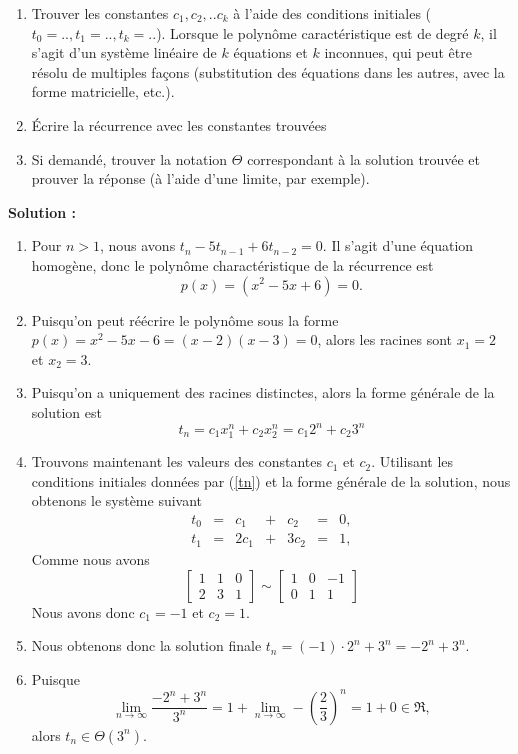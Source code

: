 \documentclass[11pt]{article} %
\newenvironment{solution}[1][\unskip]{%
	\par
	\noindent
	\textbf{Solution #1:}
	\noindent}
{\medskip}
\begin{document}
{\begin{enumerate}
\begin{itemize}
		\end{itemize}
		\item Trouver les constantes $c_1, c_2, ..c_k$ à l'aide des conditions initiales ($t_0 = .., t_1=.., t_k = ..$). Lorsque le polynôme caractéristique est de degré $k$, il s'agit d'un système linéaire de $k$ équations et $k$ inconnues, qui peut être résolu de multiples façons (substitution des équations dans les autres, avec la forme matricielle, etc.).
		\item Écrire la récurrence avec les constantes trouvées
		\item Si demandé, trouver la notation $\Theta$ correspondant à la solution trouvée et prouver la réponse (à l'aide d'une limite, par exemple).
	\end{enumerate}
}
\begin{solution}
	\begin{enumerate}
		\item Pour $n>1$, nous avons $t_n-5t_{n-1}+6t_{n-2}=0$. Il s'agit d'une équation homogène, donc le polynôme charactéristique de la récurrence est $$p(x)=(x^2-5x+6)=0.$$
		\item Puisqu'on peut réécrire le polynôme sous la forme $p(x) = x^2-5x-6 = (x-2)(x-3)=0$, alors les racines sont $x_1 = 2$ et $x_2 = 3$.
		\item Puisqu'on a uniquement des racines distinctes, alors la forme générale de la solution est
		$$t_n = c_1 x_1^n + c_2 x_2^n = c_1 2^n + c_2 3^n$$
		\item Trouvons maintenant les valeurs des constantes $c_1$ et $c_2$.
	Utilisant les conditions initiales données par (\ref{tn}) et la forme générale de la solution, nous obtenons le système suivant
	\begin{equation*}
	\begin{array}{ccccccccc}
	t_0 & = & c_1 & + & c_2 &=& 0,\\
	t_1 & = & 2c_1& + & 3c_2& = & 1,
	\end{array}
	\end{equation*}
	Comme nous avons
	\begin{equation*}
	\left[\begin{array}{cc|c}
	1 & 1 & 0\\
	2 & 3 & 1
	\end{array}\right] \sim \left[\begin{array}{cc|c}
	1 & 0  & -1\\
	0 & 1  & 1
	\end{array}\right]
	\end{equation*}
	Nous avons donc $c_1 = -1$ et $c_2 = 1$.
	\item 	Nous obtenons donc la solution finale $t_n=(-1)\cdot2^n +3^n = -2^n+3^n.$
	\item Puisque $$\lim_{n\rightarrow \infty}\frac{- 2^n +3^n}{3^n} = 1+ \lim_{n\rightarrow \infty}-\left(\frac{2}{3}\right)^n = 1+0 \in \Re,$$ alors $t_n \in \Theta(3^n).$ 
\end{enumerate}
\end{solution}
	
\end{document}

